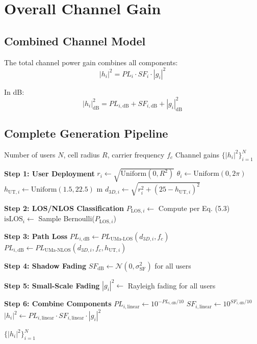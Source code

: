 \section{Overall Channel Gain}

\subsection{Combined Channel Model}

The total channel power gain combines all components:
\begin{equation}
|h_i|^2 = PL_i \cdot SF_i \cdot |g_i|^2
\end{equation}

In dB:
\begin{equation}
|h_i|^2_{\text{dB}} = PL_{i,\text{dB}} + SF_{i,\text{dB}} + |g_i|^2_{\text{dB}}
\end{equation}

\subsection{Complete Generation Pipeline}

\begin{algorithm}[H]
\caption{3GPP UMa Channel Generation}
\label{alg:channel_gen}
\begin{algorithmic}[1]
\Require Number of users $N$, cell radius $R$, carrier frequency $f_c$
\Ensure Channel gains $\{|h_i|^2\}_{i=1}^N$

\State \textbf{Step 1: User Deployment}
    \State $r_i \gets \sqrt{\text{Uniform}(0, R^2)}$
    \State $\theta_i \gets \text{Uniform}(0, 2\pi)$
    \State $h_{\text{UT},i} \gets \text{Uniform}(1.5, 22.5)$ m
    \State $d_{3D,i} \gets \sqrt{r_i^2 + (25 - h_{\text{UT},i})^2}$
\EndFor

\State \textbf{Step 2: LOS/NLOS Classification}
    \State $P_{\text{LOS},i} \gets $ Compute per Eq. (5.3)
    \State $\text{isLOS}_i \gets $ Sample Bernoulli($P_{\text{LOS},i}$)
\EndFor

\State \textbf{Step 3: Path Loss}
        \State $PL_{i,\text{dB}} \gets PL_{\text{UMa-LOS}}(d_{3D,i}, f_c)$
    \Else
        \State $PL_{i,\text{dB}} \gets PL_{\text{UMa-NLOS}}(d_{3D,i}, f_c, h_{\text{UT},i})$
    \EndIf
\EndFor

\State \textbf{Step 4: Shadow Fading}
\State $SF_{\text{dB}} \gets \mathcal{N}(0, \sigma_{\text{SF}}^2)$ for all users

\State \textbf{Step 5: Small-Scale Fading}
\State $|g_i|^2 \gets $ Rayleigh fading for all users

\State \textbf{Step 6: Combine Components}
    \State $PL_{i,\text{linear}} \gets 10^{-PL_{i,\text{dB}}/10}$
    \State $SF_{i,\text{linear}} \gets 10^{SF_{i,\text{dB}}/10}$
    \State $|h_i|^2 \gets PL_{i,\text{linear}} \cdot SF_{i,\text{linear}} \cdot |g_i|^2$
\EndFor

\State \Return $\{|h_i|^2\}_{i=1}^N$
\end{algorithmic}
\end{algorithm}

